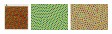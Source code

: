 \begin{itemize}
\includegraphics[height=1.4cm]{python_codes/fieldstone_171/images/pear93_lambda}
\includegraphics[height=1.4cm]{python_codes/fieldstone_171/images/munafo_lambda1}
\includegraphics[height=1.4cm]{python_codes/fieldstone_171/images/munafo_lambda2}


\end{itemize}
